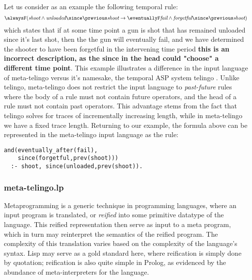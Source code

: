 Let us consider as an example the following temporal rule:
\begin{equation*}
\alwaysF(\textit{shoot} \wedge \textit{unloaded} \since \previous \textit{shoot} 
\rightarrow \eventuallyF \textit{fail} \wedge \textit{forgetful} \since \previous \textit{shoot})
\end{equation*}
which states that if at some time point a gun is shot that has
remained unloaded since it's last shot, then the the gun will
eventually fail, and we have determined the shooter to have been
forgetful in the intervening time period \textbf{this is an incorrect
  description, as the since in the head could "choose" a different
  time point}. This example illustrates a difference in the input
language of meta-telingo versus it's namesake, the temporal ASP system
telingo\cite{cakamosc19a} \cite{agcadipescscvi20a}. Unlike telingo,
meta-telingo does not restrict the input language to
\emph{past-future} rules \cite{agcadipescscvi20a} where the body of a
rule must not contain future operators, and the head of a rule must
not contain past operators. This advantage stems from the fact that
telingo solves for traces of incrementally increasing length, while in
meta-telingo we have a fixed trace length. Returning to our example,
the formula above can be represented in the meta-telingo input
language as the rule:
\begin{center}
    \begin{lstlisting}[numbers=none]
and(eventually_after(fail),
    since(forgetful,prev(shoot))) 
  :- shoot, since(unloaded,prev(shoot)).
    \end{lstlisting}
\end{center}

\subsubsection{meta-telingo.lp}

Metaprogramming is a generic technique in programming languages, where
an input program is translated, or \emph{reified} into some primitive
datatype of the language. This reified representation then serve as
input to a meta program, which in turn may reinterpret the semantics
of the reified program. The complexity of this translation varies
based on the complexity of the language's syntax. Lisp may serve as a
gold standard here, where reification is simply done by quotation;
reification is also quite simple in Prolog, as evidenced by the
abundance of meta-interpreters for the language. 

